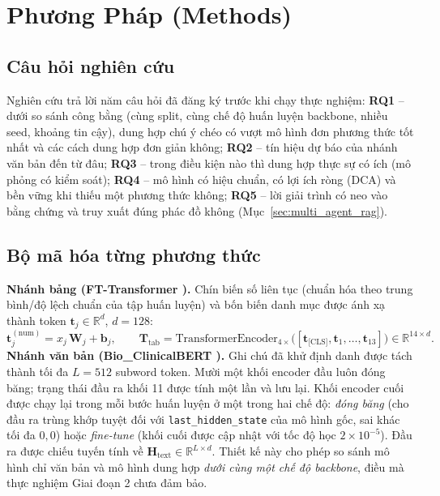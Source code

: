 \section{Phương Pháp (Methods)}
\label{sec:methodology}

\subsection{Câu hỏi nghiên cứu}
Nghiên cứu trả lời năm câu hỏi đã đăng ký trước khi chạy thực nghiệm:
\textbf{RQ1} -- dưới so sánh công bằng (cùng split, cùng chế độ huấn luyện backbone, nhiều seed, khoảng tin cậy), dung hợp chú ý chéo có vượt mô hình đơn phương thức tốt nhất và các cách dung hợp đơn giản không;
\textbf{RQ2} -- tín hiệu dự báo của nhánh văn bản đến từ đâu;
\textbf{RQ3} -- trong điều kiện nào thì dung hợp thực sự có ích (mô phỏng có kiểm soát);
\textbf{RQ4} -- mô hình có hiệu chuẩn, có lợi ích ròng (DCA) và bền vững khi thiếu một phương thức không;
\textbf{RQ5} -- lời giải trình có neo vào bằng chứng và truy xuất đúng phác đồ không (Mục~\ref{sec:multi_agent_rag}).

\subsection{Bộ mã hóa từng phương thức}
\textbf{Nhánh bảng (FT-Transformer \cite{gorishniy2021revisiting}).} Chín biến số liên tục (chuẩn hóa theo trung bình/độ lệch chuẩn của tập huấn luyện) và bốn biến danh mục được ánh xạ thành token $\bm{t}_j\in\mathbb{R}^{d}$, $d=128$:
\begin{equation}
  \bm{t}_j^{(\text{num})}=x_j\,\bm{W}_j+\bm{b}_j,\qquad
  \bm{T}_{\text{tab}}=\mathrm{TransformerEncoder}_{4\times}\big([\bm{t}_{\text{[CLS]}},\bm{t}_1,\dots,\bm{t}_{13}]\big)\in\mathbb{R}^{14\times d}.
\end{equation}
\textbf{Nhánh văn bản (Bio\_ClinicalBERT \cite{alsentzer2019publicly}).} Ghi chú đã khử định danh được tách thành tối đa $L=512$ subword token. Mười một khối encoder đầu luôn đóng băng; trạng thái đầu ra khối 11 được tính một lần và lưu lại. Khối encoder cuối được chạy lại trong mỗi bước huấn luyện ở một trong hai chế độ: \emph{đóng băng} (cho đầu ra trùng khớp tuyệt đối với \texttt{last\_hidden\_state} của mô hình gốc, sai khác tối đa $0{,}0$) hoặc \emph{fine-tune} (khối cuối được cập nhật với tốc độ học $2\times10^{-5}$). Đầu ra được chiếu tuyến tính về $\bm{H}_{\text{text}}\in\mathbb{R}^{L\times d}$. Thiết kế này cho phép so sánh mô hình chỉ văn bản và mô hình dung hợp \emph{dưới cùng một chế độ backbone}, điều mà thực nghiệm Giai đoạn 2 chưa đảm bảo.

